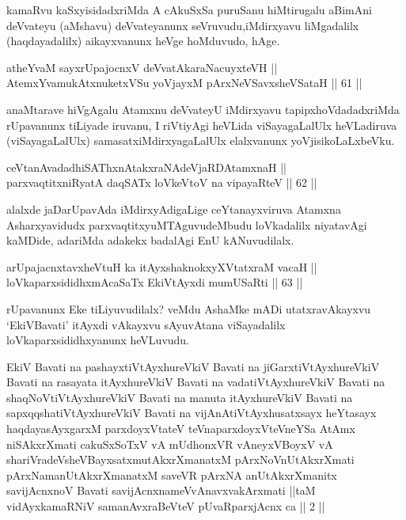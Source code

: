 \begin{artha}
kamaRvu kaSxyisidadxriMda A cAkuSxSa puruSanu hiMtirugalu aBimAni
deVvateyu (aMshavu) deVvateyanunx seVruvudu,\break iMdirxyavu liMgadalilx
(haqdayadalilx) aikayxvanunx heVge hoMduvudo, hAge.
\end{artha}

\begin{shl}
atheYvaM sayxrUpajocnxV deVvatAkaraNacuyxteVH ||  \\
AtemxYvamukAtxnuketxVSu yoVjayxM pArxNeVSavxsheVSataH \hfill || 61 ||  
\end{shl}

\begin{artha}
anaMtarave hiVgAgalu Atamxnu deVvateyU iMdirxyavu tapipxhoVdadadxriMda
rUpavanunx tiLiyade iruvanu, I riVtiyAgi heVLida viSayagaLalUlx
heVLadiruva (viSayagaLalUlx) samasatx\break iMdirxyagaLalUlx elalxvanunx
yoVjisikoLaLxbeVku.
\end{artha}

\begin{shl}
ceVtanAvadadhiSAThxnAtakxraNAdeVjaRDAtamxnaH || \\
parxvaqtitxniRyatA daqSATx loVkeV\s toV na vipayaRteV \hfill || 62 ||  
\end{shl}

\begin{artha}
alalxde jaDarUpavAda iMdirxyAdigaLige ceYtanayxviruva Atamxna
Asharxyavidudx parxvaqtitxyuMTAguvudeMbudu loVkadalilx niyatavAgi
kaMDide, adariMda adakekx badalAgi EnU kANuvudilalx.
\end{artha}

\begin{shl}
arUpajacnxtavxheVtuH ka itAyxshaknokxyXVtatxraM vacaH || \\
loVkaparxsididhxmAcaSaTx EkiVtAyxdi mumUSaRti \hfill || 63 ||  
\end{shl}

\begin{artha}
rUpavanunx Eke tiLiyuvudilalx? veMdu AshaMke mADi utatxravAkayxvu
`EkiVBavati' itAyxdi vAkayxvu sAyuvAtana viSayadalilx
loVkaparxsididhxyanunx heVLuvudu.
\end{artha}

\begin{kandikeshl}
EkiV Bavati na pashayxtiVtAyxhureVkiV Bavati na jiGarxtiVtAyxhureVkiV Bavati na rasayata itAyxhureVkiV Bavati na vadatiVtAyxhureVkiV Bavati na shaqNoVtiVtAyxhureVkiV Bavati na manuta itAyxhureVkiV Bavati na sapxqqshatiVtAyxhureVkiV Bavati na vijAnAtiVtAyxhusatxsayx heYtasayx haqdayasAyxgarxM parxdoyxVtateV teVna\break parxdoyxVteVneYSa AtAmx niSAkxrXmati cakuSxSoTxV vA mUdhonxVR vAneyxVBoyxV vA shariVradeVsheVBayxsatxmutAkxrXmanatxM pArxNoV\s nUtAkxrXmati pArxNamanUtAkxrXmanatxM saveVR pArxNA anUtAkxrXmanitx savijAcnxnoV Bavati savijAcnxnameVvAnavxvakArxmati ||taM vidAyxkamaRNiV samanAvxraBeVteV pUvaRparxjAcnx ca || 2 ||
\end{kandikeshl}


